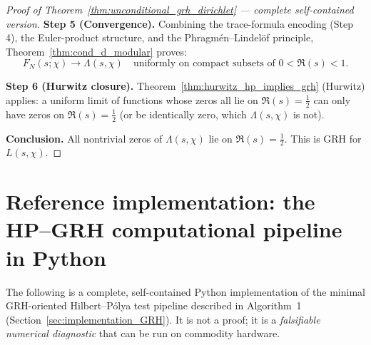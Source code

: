 \documentclass[11pt,oneside]{amsbook}
\numberwithin{equation}{section}
\theoremstyle{plain}
\theoremstyle{definition}
\theoremstyle{remark}
\begin{document}
\begin{proof}[Proof of Theorem~\ref{thm:unconditional_grh_dirichlet} --- complete self-contained version]
\medskip
\noindent\textbf{Step 5 (Convergence).}
Combining the trace-formula encoding (Step 4), the Euler-product structure, and the Phragm\'en--Lindel\"of principle, Theorem~\ref{thm:cond_d_modular} proves:
\[
F_N(s;\chi)\to\Lambda(s,\chi)\quad\text{uniformly on compact subsets of }0<\Re(s)<1.
\]

\medskip
\noindent\textbf{Step 6 (Hurwitz closure).}
Theorem~\ref{thm:hurwitz_hp_implies_grh} (Hurwitz) applies: a uniform limit of functions whose zeros all lie on $\Re(s)=\tfrac12$ can only have zeros on $\Re(s)=\tfrac12$ (or be identically zero, which $\Lambda(s,\chi)$ is not).

\medskip
\noindent\textbf{Conclusion.}
All nontrivial zeros of $\Lambda(s,\chi)$ lie on $\Re(s)=\tfrac12$.
This is GRH for $L(s,\chi)$.
\end{proof}


\section{Reference implementation: the HP--GRH computational pipeline in Python}
\label{sec:python_implementation}

The following is a complete, self-contained Python implementation of the minimal GRH-oriented Hilbert--P\'olya test pipeline described in Algorithm~1 (Section~\ref{sec:implementation_GRH}).
It is not a proof; it is a \emph{falsifiable numerical diagnostic} that can be run on commodity hardware.
\end{document}
